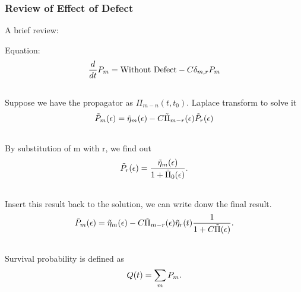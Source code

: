 \documentclass[letterpaper,10pt,english]{sphinxmanual}
\begin{document}
\subsubsection{Review of Effect of Defect}
\label{nonequilibrium/effectOfDefects:review-of-effect-of-defect}
A brief review:

Equation:
\begin{gather}
\begin{split}\frac{d}{dt} P_m = \text{Without Defect} - C \delta_{m,r} P_m\end{split}\notag\\\begin{split}\end{split}\notag
\end{gather}
Suppose we have the propagator as $\Pi_{m-n}(t,t_0)$. Laplace transform to solve it
\begin{gather}
\begin{split}\tilde P_m(\epsilon) = \tilde \eta_m(\epsilon) - C\tilde \Pi_{m-r}(\epsilon) \tilde P_r(\epsilon)\end{split}\notag\\\begin{split}\end{split}\notag
\end{gather}
By substitution of m with r, we find out
\begin{gather}
\begin{split}\tilde P_r(\epsilon) = \frac{\tilde \eta_m(\epsilon)}{1+ \tilde \Pi_0(\epsilon)}.\end{split}\notag\\\begin{split}\end{split}\notag
\end{gather}
Insert this result back to the solution, we can write donw the final result.
\begin{gather}
\begin{split}\tilde P_m(\epsilon) = \tilde \eta_m(\epsilon) - C\tilde \Pi_{m-r}(\epsilon) \tilde \eta_r(t) \frac{1}{1+C\tilde \Pi(\epsilon)}.\end{split}\notag\\\begin{split}\end{split}\notag
\end{gather}
Survival probability is defined as
\begin{gather}
\begin{split}Q(t) = \sum_m P_m .\end{split}\notag\\\begin{split}\end{split}\notag
\end{gather}
\end{document}

